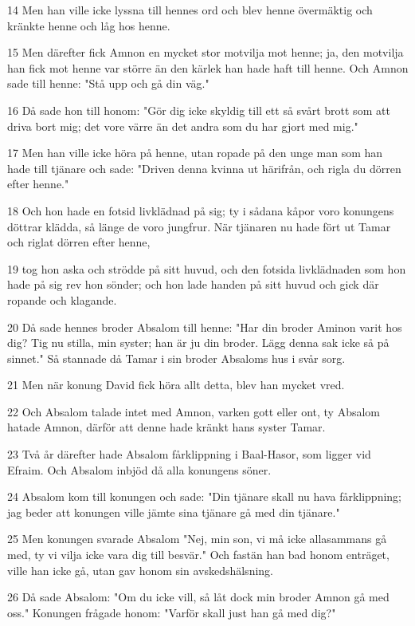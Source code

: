\par 14 Men han ville icke lyssna till hennes ord och blev henne övermäktig och kränkte henne och låg hos henne.
\par 15 Men därefter fick Amnon en mycket stor motvilja mot henne; ja, den motvilja han fick mot henne var större än den kärlek han hade haft till henne. Och Amnon sade till henne: "Stå upp och gå din väg."
\par 16 Då sade hon till honom: "Gör dig icke skyldig till ett så svårt brott som att driva bort mig; det vore värre än det andra som du har gjort med mig."
\par 17 Men han ville icke höra på henne, utan ropade på den unge man som han hade till tjänare och sade: "Driven denna kvinna ut härifrån, och rigla du dörren efter henne."
\par 18 Och hon hade en fotsid livklädnad på sig; ty i sådana kåpor voro konungens döttrar klädda, så länge de voro jungfrur. När tjänaren nu hade fört ut Tamar och riglat dörren efter henne,
\par 19 tog hon aska och strödde på sitt huvud, och den fotsida livklädnaden som hon hade på sig rev hon sönder; och hon lade handen på sitt huvud och gick där ropande och klagande.
\par 20 Då sade hennes broder Absalom till henne: "Har din broder Aminon varit hos dig? Tig nu stilla, min syster; han är ju din broder. Lägg denna sak icke så på sinnet." Så stannade då Tamar i sin broder Absaloms hus i svår sorg.
\par 21 Men när konung David fick höra allt detta, blev han mycket vred.
\par 22 Och Absalom talade intet med Amnon, varken gott eller ont, ty Absalom hatade Amnon, därför att denne hade kränkt hans syster Tamar.
\par 23 Två år därefter hade Absalom fårklippning i Baal-Hasor, som ligger vid Efraim. Och Absalom inbjöd då alla konungens söner.
\par 24 Absalom kom till konungen och sade: "Din tjänare skall nu hava fårklippning; jag beder att konungen ville jämte sina tjänare gå med din tjänare."
\par 25 Men konungen svarade Absalom "Nej, min son, vi må icke allasammans gå med, ty vi vilja icke vara dig till besvär." Och fastän han bad honom enträget, ville han icke gå, utan gav honom sin avskedshälsning.
\par 26 Då sade Absalom: "Om du icke vill, så låt dock min broder Amnon gå med oss." Konungen frågade honom: "Varför skall just han gå med dig?"
